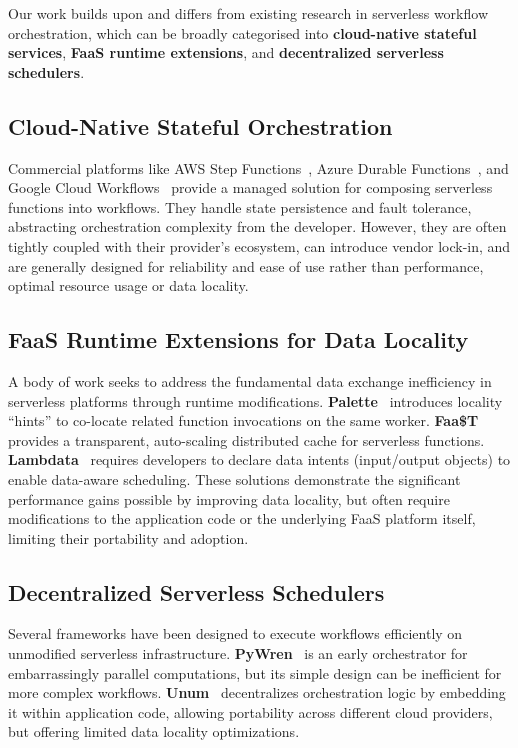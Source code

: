 \documentclass[conference]{IEEEtran}
\begin{document}
Our work builds upon and differs from existing research in serverless workflow orchestration, which can be broadly categorised into \textbf{cloud-native stateful services}, \textbf{FaaS runtime extensions}, and \textbf{decentralized serverless schedulers}.

\subsection{Cloud-Native Stateful Orchestration}
Commercial platforms like AWS Step Functions~\cite{aws_step_functions}, Azure Durable Functions~\cite{azure_durable_functions}, and Google Cloud Workflows~\cite{google_cloud_workflows} provide a managed solution for composing serverless functions into workflows. They handle state persistence and fault tolerance, abstracting orchestration complexity from the developer. However, they are often tightly coupled with their provider's ecosystem, can introduce vendor lock-in, and are generally designed for reliability and ease of use rather than performance, optimal resource usage or data locality.

\subsection{FaaS Runtime Extensions for Data Locality}
A body of work seeks to address the fundamental data exchange inefficiency in serverless platforms through runtime modifications. \textbf{Palette}~\cite{palette_load_balancing} introduces locality ``hints'' to co-locate related function invocations on the same worker. \textbf{Faa\$T}~\cite{faast_caching} provides a transparent, auto-scaling distributed cache for serverless functions. \textbf{Lambdata}~\cite{lambdata_intents} requires developers to declare data intents (input/output objects) to enable data-aware scheduling. These solutions demonstrate the significant performance gains possible by improving data locality, but often require modifications to the application code or the underlying FaaS platform itself, limiting their portability and adoption.

\subsection{Decentralized Serverless Schedulers}
Several frameworks have been designed to execute workflows efficiently on unmodified serverless infrastructure. \textbf{PyWren}~\cite{pywren} is an early orchestrator for embarrassingly parallel computations, but its simple design can be inefficient for more complex workflows. \textbf{Unum}~\cite{unum_decentralized_orchestrator} decentralizes orchestration logic by embedding it within application code, allowing portability across different cloud providers, but offering limited data locality optimizations.
\end{document}
